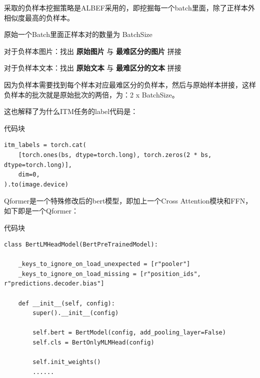 \documentclass[zihao=false,fontset=windows]{ctexart}
\newcommand{\codehead}{{\small\ttfamily\color{feishuGray}代码块}\par\vspace{-0.15em}}
\begin{document}
\textcolor{feishuRed}{采取的负样本挖掘策略是ALBEF采用的，即挖掘每一个batch里面，除了正样本外相似度最高的负样本。}\par

原始一个Batch里面正样本对的数量为 BatchSize\par

对于负样本图片：找出 \textbf{原始图片} 与 \textbf{最难区分的图片 }拼接\par

对于负样本文本：找出 \textbf{原始文本} 与 \textbf{最难区分的文本} 拼接\par

因为负样本需要找到每个样本对应最难区分的负样本，然后与原始样本拼接，这样负样本的批次就是原始批次的两倍，为：2 x BatchSize。\par

这也解释了为什么ITM任务的label代码是：\par

\begin{feishucode}
\codehead
\begin{lstlisting}
itm_labels = torch.cat(
    [torch.ones(bs, dtype=torch.long), torch.zeros(2 * bs, dtype=torch.long)],
    dim=0,
).to(image.device)
\end{lstlisting}
\end{feishucode}

\par\vspace{0.6em}\par\vspace{0.2em}

Qformer是一个特殊修改后的bert模型，即加上一个Cross Attention模块和FFN，如下即是一个Qformer：\par

\begin{feishucode}
\codehead
\begin{lstlisting}
class BertLMHeadModel(BertPreTrainedModel):

    _keys_to_ignore_on_load_unexpected = [r"pooler"]
    _keys_to_ignore_on_load_missing = [r"position_ids", r"predictions.decoder.bias"]

    def __init__(self, config):
        super().__init__(config)

        self.bert = BertModel(config, add_pooling_layer=False)
        self.cls = BertOnlyMLMHead(config)

        self.init_weights()
        ......
\end{lstlisting}
\end{feishucode}
\end{document}
